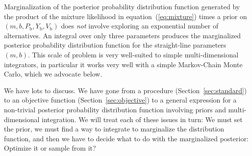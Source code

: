 \documentclass[12pt,twoside,pdftex]{article}
\newcommand{\sectionname}{Section}
\newcommand{\equationname}{equation}
\newcounter{problem}
\newcommand{\Pbad}{P_{\mathrm{b}}}
\newcommand{\Ybad}{Y_{\mathrm{b}}}
\newcommand{\Vbad}{V_{\mathrm{b}}}
\begin{document}
Marginalization of the posterior probability distribution function
generated by the product of the mixture likelihood in
\equationname~(\ref{eq:mixture}) times a prior on
$(m,b,\Pbad,\Ybad,\Vbad)$ does \emph{not} involve exploring an
exponential number of alternatives.  An integral over only three
parameters produces the marginalized posterior probability
distribution function for the straight-line parameters $(m,b)$.  This
scale of problem is very well-suited to simple multi-dimensional
integrators, in particular it works very well with a simple
Markov-Chain Monte Carlo, which we advocate below.

We have lots to discuss.  We have gone from a procedure
(\sectionname~\ref{sec:standard}) to an objective function
(\sectionname~\ref{sec:objective}) to a general expression for a
non-trivial posterior probability distribution function involving
priors and multi-dimensional integration.  We will treat each of
these issues in turn: We must set the prior, we must find a way to
integrate to marginalize the distribution function, and then we have
to decide what to do with the marginalized posterior: Optimize it or
sample from it?
\end{document}
